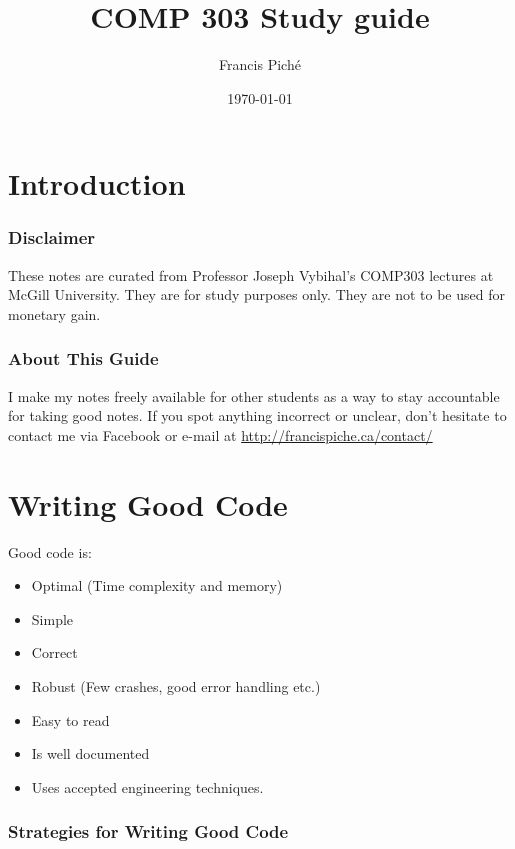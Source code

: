 \documentclass[12pt]{article}
\theoremstyle{definition}
\begin{document}
\title{COMP 303 Study guide}
\author{Francis Pich\'e}
\date{\today}
\maketitle
\newpage
\tableofcontents
\newpage

\part{Introduction}
\section{Disclaimer}
These notes are curated from Professor Joseph Vybihal's COMP303 lectures at McGill University. They are for study purposes only. They are not to be used for monetary gain.
\section{About This Guide}
I make my notes freely available for other students as a way to stay accountable for taking good notes. If you spot anything incorrect or unclear, don't hesitate to contact me via Facebook or e-mail at \url{http://francispiche.ca/contact/}
\part{Writing Good Code}
Good code is:
\begin{itemize}
	\item Optimal (Time complexity and memory)
	\item Simple
	\item Correct
	\item Robust (Few crashes, good error handling etc.)
	\item Easy to read
	\item Is well documented
	\item Uses accepted engineering techniques.
\end{itemize}
\section{Strategies for Writing Good Code}
\end{document}
